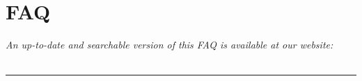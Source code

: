 \documentclass[12pt,twoside]{report}
\begin{document}
\chapter{FAQ}
\label{chapter:faq}
\newpage
\noindent
{\it An up-to-date and searchable version of this FAQ is available at our website:\\
}\\
\hspace{1mm}
\rule{\textwidth}{0.1pt}
\hspace{3mm}



\newpage
{}
\printindex
\renewcommand{\bibname}{References}


\end{document}

